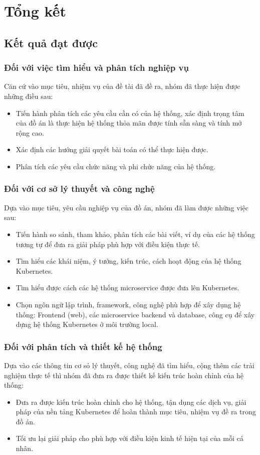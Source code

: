 \chapter{Tổng kết}
\section{Kết quả đạt được}
\subsection{Đối với việc tìm hiểu và phân tích nghiệp vụ}
\noindent Căn cứ vào mục tiêu, nhiệm vụ của đề tài đã đề ra, nhóm đã thực hiện được những điều sau:
\begin{itemize}
    \item Tiến hành phân tích các yêu cầu cần có của hệ thống, xác định trọng tâm của đồ án là thực hiện hệ thống thỏa mãn được tính sẵn sàng và tính mở rộng cao.
    \item Xác định các hướng giải quyết bài toán có thể thực hiện được.
    \item Phân tích các yêu cầu chức năng và phi chức năng của hệ thống.
\end{itemize}

\subsection{Đối với cơ sở lý thuyết và công nghệ}
\noindent Dựa vào mục tiêu, yêu cầu nghiệp vụ của đồ án, nhóm đã làm được những việc sau:
\begin{itemize}
    \item Tiến hành so sánh, tham khảo, phân tích các bài viết, ví dụ của các hệ thống tương tự để đưa ra giải pháp phù hợp với điều kiện thực tế.
    \item Tìm hiểu các khái niệm, ý tưởng, kiến trúc, cách hoạt động của hệ thống Kubernetes.
    \item Tìm hiểu được cách các hệ thống microservice được đưa lên Kubernetes.
    \item Chọn ngôn ngữ lập trình, framework, công nghệ phù hợp để xây dụng hệ thống: Frontend (web), các microservice backend và database, công cụ để xây dựng hệ thống Kubernetes ở môi trường local.
\end{itemize}
\subsection{Đối với phân tích và thiết kế hệ thống}
\noindent Dựa vào các thông tin cơ sỏ lý thuyết, công nghệ đã tìm hiểu, cộng thêm các trải nghiệm thực tế thì nhóm đã đưa ra được thiết kế kiến trúc hoàn chỉnh của hệ thống:
\begin{itemize}
    \item Đưa ra được kiến trúc hoàn chỉnh cho hệ thống, tận dụng các dịch vụ, giải pháp của nền tảng Kubernetes để hoàn thành mục tiêu, nhiệm vụ đề ra trong đồ án.
    \item Tối ưu lại giải pháp cho phù hợp với điều kiện kinh tế hiện tại của mỗi cá nhân.
\end{itemize}
